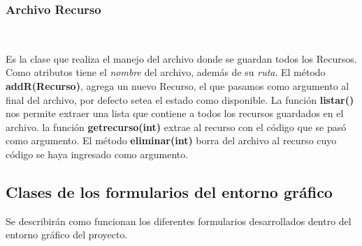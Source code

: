 \documentclass[12pt]{article}
\begin{document}
\subsubsection{Archivo Recurso}
\begin{center}
\\
\end{center}

Es la clase que realiza el manejo del archivo donde se guardan todos los Recursos.  Como atributos tiene el \textit{nombre }del archivo, además de su \textit{ruta}.  El método \textbf{addR(Recurso)}, agrega un nuevo Recurso, el que pasamos como argumento al final del archivo, por defecto setea el estado como disponible.  La función \textbf{listar()} nos permite extraer una lista que contiene a todos los recursos guardados en el archivo. la función \textbf{getrecurso(int)} extrae al recurso con el código que se pasó como argumento.  El método \textbf{eliminar(int)} borra del archivo al recurso cuyo código se haya ingresado como argumento. 


\subsection{Clases de los formularios del entorno gráfico}
Se describirán como funcionan los diferentes formularios desarrollados dentro del entorno gráfico del proyecto.  
\end{document}
